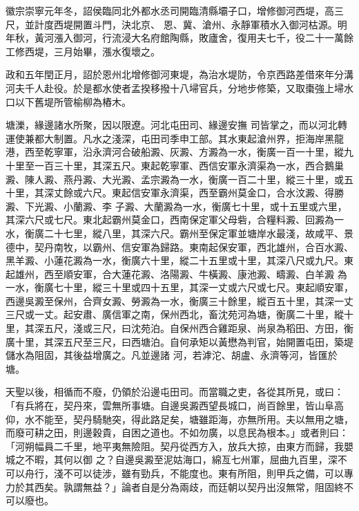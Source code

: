 \begin{pinyinscope}
 徽宗崇寧元年冬，詔侯臨同北外都水丞司開臨清縣壩子口，增修御河西堤，高三尺，並計度西堤開置斗門，決北京、
 恩、冀、滄州、永靜軍積水入御河枯源。明年秋，黃河漲入御河，行流浸大名府館陶縣，敗廬舍，復用夫七千，役二十一萬餘工修西堤，三月始畢，漲水復壞之。



 政和五年閏正月，詔於恩州北增修御河東堤，為治水堤防，令京西路差借來年分溝河夫千人赴役。於是都水使者孟揆移撥十八埽官兵，分地步修築，又取棗強上埽水口以下舊堤所管榆柳為樁木。



 塘濼，緣邊諸水所聚，因以限遼。河北屯田司、緣邊安撫
 司皆掌之，而以河北轉運使兼都大制置。凡水之淺深，屯田司季申工部。其水東起滄州界，拒海岸黑龍港，西至乾寧軍，沿永濟河合破船澱、灰澱、方澱為一水，衡廣一百一十里，縱九十里至一百三十里，其深五尺。東起乾寧軍、西信安軍永濟渠為一水，西合鵝巢澱、陳人澱、燕丹澱、大光澱、孟宗澱為一水，衡廣一百二十里，縱三十里，或五十里，其深丈餘或六尺。東起信安軍永濟渠，西至霸州莫金口，合水汶澱、得勝澱、下光澱、小蘭澱、李
 子澱、大蘭澱為一水，衡廣七十里，或十五里或六里，其深六尺或七尺。東北起霸州莫金口，西南保定軍父母砦，合糧料澱、回澱為一水，衡廣二十七里，縱八里，其深六尺。霸州至保定軍並塘岸水最淺，故咸平、景德中，契丹南牧，以霸州、信安軍為歸路。東南起保安軍，西北雄州，合百水澱、黑羊澱、小蓮花澱為一水，衡廣六十里，縱二十五里或十里，其深八尺或九尺。東起雄州，西至順安軍，合大蓮花澱、洛陽澱、牛橫澱、康池澱、疇澱、白羊澱
 為一水，衡廣七十里，縱三十里或四十五里，其深一丈或六尺或七尺。東起順安軍，西邊吳澱至保州，合齊女澱、勞澱為一水，衡廣三十餘里，縱百五十里，其深一丈三尺或一丈。起安肅、廣信軍之南，保州西北，畜沈苑河為塘，衡廣二十里，縱十里，其深五尺，淺或三尺，曰沈苑泊。自保州西合雞距泉、尚泉為稻田、方田，衡廣十里，其深五尺至三尺，曰西塘泊。自何承矩以黃懋為判官，始開置屯田，築堤儲水為阻固，其後益增廣之。凡並邊諸
 河，若滹沱、胡盧、永濟等河，皆匯於塘。



 天聖以後，相循而不廢，仍領於沿邊屯田司。而當職之吏，各從其所見，或曰：「有兵將在，契丹來，雲無所事塘。自邊吳澱西望長城口，尚百餘里，皆山阜高仰，水不能至，契丹騎馳突，得此路足矣，塘雖距海，亦無所用。夫以無用之塘，而廢可耕之田，則邊穀貴，自困之道也。不如勿廣，以息民為根本。」或者則曰：「河朔幅員二千里，地平夷無險阻。契丹從西方入，放兵大掠，由東方而歸，我嬰城之不暇，其何以御
 之？自邊吳澱至泥姑海口，綿亙七州軍，屈曲九百里，深不可以舟行，淺不可以徒涉，雖有勁兵，不能度也。東有所阻，則甲兵之備，可以專力於其西矣。孰謂無益？」論者自是分為兩歧，而廷朝以契丹出沒無常，阻固終不可以廢也。




\end{pinyinscope}
